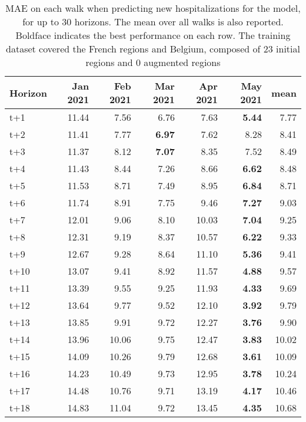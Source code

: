 \begin{table}[H]
\centering
\caption{MAE on each walk when predicting new hospitalizations for the model, for up to 30 horizons. The mean over all walks is also reported. Boldface indicates the best performance on each row. The training dataset covered the French regions and Belgium, composed of 23 initial regions and 0 augmented regions }
\label{tab:MAE_walk_encoder_decoder}
\begin{tabular}{lrrrrrr}
\toprule
Horizon &  Jan 2021 &  Feb 2021 &  Mar 2021 &  Apr 2021 &  May 2021 &  mean \\
\midrule
t+1  & 11.44  & 7.56  & 6.76  & 7.63  & \textbf{5.44}  & 7.77  \\
t+2  & 11.41  & 7.77  & \textbf{6.97}  & 7.62  & 8.28  & 8.41  \\
t+3  & 11.37  & 8.12  & \textbf{7.07}  & 8.35  & 7.52  & 8.49  \\
t+4  & 11.43  & 8.44  & 7.26  & 8.66  & \textbf{6.62}  & 8.48  \\
t+5  & 11.53  & 8.71  & 7.49  & 8.95  & \textbf{6.84}  & 8.71  \\
t+6  & 11.74  & 8.91  & 7.75  & 9.46  & \textbf{7.27}  & 9.03  \\
t+7  & 12.01  & 9.06  & 8.10  & 10.03  & \textbf{7.04}  & 9.25  \\
t+8  & 12.31  & 9.19  & 8.37  & 10.57  & \textbf{6.22}  & 9.33  \\
t+9  & 12.67  & 9.28  & 8.64  & 11.10  & \textbf{5.36}  & 9.41  \\
t+10  & 13.07  & 9.41  & 8.92  & 11.57  & \textbf{4.88}  & 9.57  \\
t+11  & 13.39  & 9.55  & 9.25  & 11.93  & \textbf{4.33}  & 9.69  \\
t+12  & 13.64  & 9.77  & 9.52  & 12.10  & \textbf{3.92}  & 9.79  \\
t+13  & 13.85  & 9.91  & 9.72  & 12.27  & \textbf{3.76}  & 9.90  \\
t+14  & 13.96  & 10.06  & 9.75  & 12.47  & \textbf{3.83}  & 10.02  \\
t+15  & 14.09  & 10.26  & 9.79  & 12.68  & \textbf{3.61}  & 10.09  \\
t+16  & 14.23  & 10.49  & 9.73  & 12.95  & \textbf{3.78}  & 10.24  \\
t+17  & 14.48  & 10.76  & 9.71  & 13.19  & \textbf{4.17}  & 10.46  \\
t+18  & 14.83  & 11.04  & 9.72  & 13.45  & \textbf{4.35}  & 10.68  \\

\end{tabular}
\end{table}
